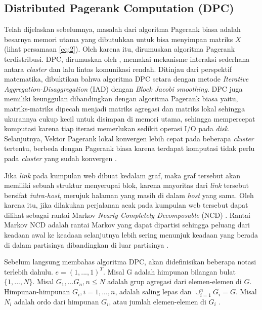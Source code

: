 \documentclass[
	a4paper, %
	12pt, %
	unnumberedsections, %
	twoside, %
]{LTJournalArticle}
\begin{document}
\subsection{Distributed Pagerank Computation (DPC)}

Telah dijelaskan sebelumnya, masalah dari algoritma Pagerank biasa adalah besarnya memori utama yang dibutuhkan untuk bisa menyimpan matriks $X$ (lihat persamaan \ref{eq:2}). Oleh karena itu, dirumuskan algoritma Pagerank terdistribusi. DPC, dirumuskan oleh \citet{zhuetal2005distributedPagerank}, memakai mekanisme interaksi sederhana antara \textit{cluster} dan lalu lintas komunikasi rendah. Ditinjau dari perspektif matematika, dibuktikan bahwa algoritma DPC setara dengan metode \textit{Iterative Aggregation-Disaggregation} (IAD) dengan \textit{Block Jacobi smoothing}. DPC juga memiliki keunggulan dibandingkan dengan algoritma Pagerank biasa yaitu, matriks-matriks dipecah menjadi matriks agregasi dan matriks lokal sehingga ukurannya cukup kecil untuk disimpan di memori utama, sehingga mempercepat komputasi karena tiap iterasi memerlukan sedikit operasi I/O pada \textit{disk}. Selanjutnya, Vektor Pagerank lokal konvergen lebih cepat pada beberapa \textit{cluster} tertentu, berbeda dengan Pagerank biasa karena terdapat komputasi tidak perlu pada \textit{cluster} yang sudah konvergen \citep{zhuetal2005distributedPagerank}.

Jika \textit{link} pada kumpulan web dibuat kedalam graf, maka graf tersebut akan memiliki sebuah struktur menyerupai blok, karena mayoritas dari \textit{link} tersebut bersifat \textit{intra-host}, merujuk halaman yang masih di dalam \textit{host} yang sama. Oleh karena itu, jika dilakukan perjalanan acak pada kumpulan web tersebut dapat dilihat sebagai rantai Markov \textit{Nearly Completely Decomposable} (NCD) \citep{zhuetal2005distributedPagerank}. Rantai Markov NCD adalah rantai Markov yang dapat dipartisi sehingga peluang dari keadaan awal ke keadaan selanjutnya lebih sering menunjuk keadaan yang berada di dalam partisinya dibandingkan di luar partisinya \citep{kontovasilisMitrou1995}.

Sebelum langsung membahas algoritma DPC, akan didefinisikan beberapa notasi terlebih dahulu. $e=(1,...,1)^T$. Misal G adalah himpunan bilangan bulat $\{1,...,N\}$. Misal $G_1,...G_n, n \leq N$ adalah grup agregasi dari elemen-elemen di $G$. Himpunan-himpunan $G_i, i = 1,...,n$, adalah saling lepas dan $\cup^n_{i=1}G_i=G$. Misal $N_i$ adalah ordo dari himpunan $G_i$, atau jumlah elemen-elemen di $G_i$ \citep{zhuetal2005distributedPagerank}. 
\end{document}
